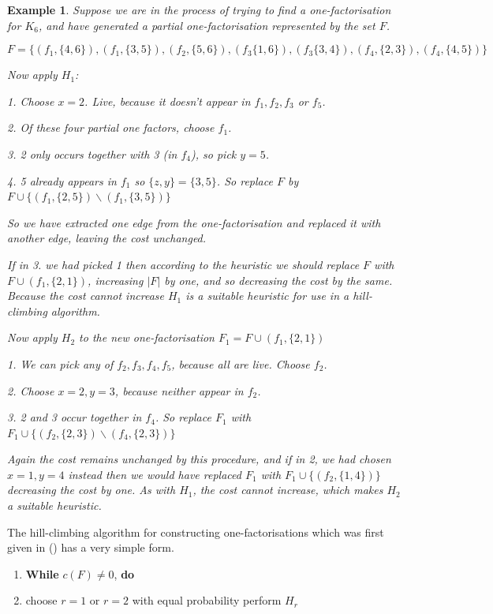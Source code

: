 \documentclass[
  11pt,
  a4paper]{book}
\newtheorem{example}{Example}
\begin{document}
\begin{example}
Suppose we are in the process of trying to find a
one-factorisation for $K_6$, and have generated a partial
one-factorisation represented by the set $F$.

$$F=\{(f_1,\{4,6\}),(f_1,\{3,5\}),(f_2,\{5,6\}),(f_3\{1,6\}), (f_3\{3,4\}),(f_4,\{2,3\}),(f_4,\{4,5\})\}$$

Now apply $H_1$:

  1. Choose $x = 2$. Live, because it doesn’t appear in
     $f_1, f_2, f_3$ or $f_5$.

  2. Of these four partial one factors, choose $f_1$.

  3. 2 only occurs together with 3 (in $f_4$),
     so pick $y = 5$.

  4. 5 already appears in $f_1$ so $\{z, y\} = \{3, 5\}$.
     So replace $F$ by
     $F \cup \{(f_1, \{2, 5\}) \backslash (f_1, \{3, 5\})\}$

So we have extracted one edge from the one-factorisation and replaced it with another edge, leaving the cost unchanged.

If in 3. we had picked 1 then according to the heuristic we
should replace $F$ with $F \cup (f_1, \{2, 1\})$, increasing
$|F|$ by one, and so decreasing the cost by the same. Because
the cost cannot increase $H_1$ is a suitable heuristic for use
in a hill-climbing algorithm.

Now apply $H_2$ to the new one-factorisation
$F_1 = F \cup (f_1, \{2, 1\})$

  1. We can pick any of $f_2, f_3, f_4, f_5$,
     because all are live. Choose $f_2$.

  2. Choose $x = 2, y = 3$,
     because neither appear in $f_2$.

  3. 2 and 3 occur together in $f_4$. So replace $F_1$
     with
     $F_1 \cup \{(f_2, \{2, 3\}) \backslash (f_4, \{2, 3\})\}$

Again the cost remains unchanged by this procedure,
and if in 2, we had chosen $x = 1, y = 4$ instead then
we would have replaced $F_1$ with
$F_1 \cup \{(f_2, \{1, 4\})\}$
decreasing the cost by one. As with $H_1$,
the cost cannot increase, which makes $H_2$ a suitable
heuristic.
\end{example}

The hill-climbing algorithm for constructing one-factorisations which
was first given in
(\textcite{dinitz_hill-climbing_1987})
has a very simple form.

\begin{enumerate}
\def\labelenumi{\arabic{enumi}.}
\item
  \textbf{While} \(c(F) \neq 0\), \textbf{do}
\item
  choose \(r = 1\) or \(r = 2\) with equal probability
  perform \(H_r\)
\end{enumerate}
\end{document}

